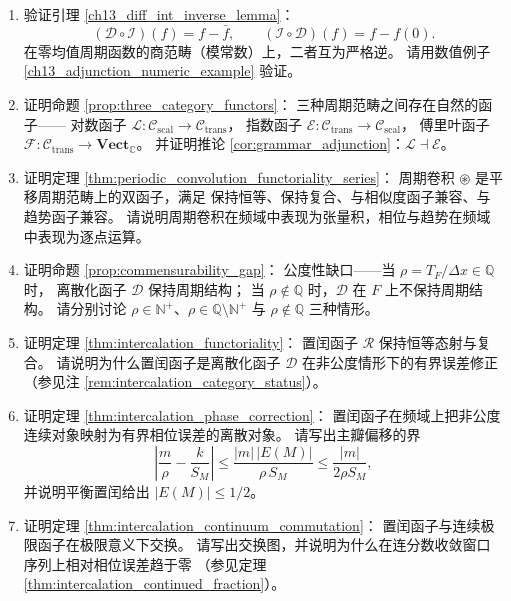 \begin{enumerate}[leftmargin=3em, label=\textbf{题 \arabic*}]
    \item 验证引理 \ref{ch13_diff_int_inverse_lemma}：
    \[
    (\mathcal{D}\circ\mathcal{I})(f)=f-\bar{f},\qquad
    (\mathcal{I}\circ\mathcal{D})(f)=f-f(0).
    \]
    在零均值周期函数的商范畴（模常数）上，二者互为严格逆。
    请用数值例子 \ref{ch13_adjunction_numeric_example} 验证。

    \item 证明命题 \ref{prop:three_category_functors}：
    三种周期范畴之间存在自然的函子——
    对数函子 $\mathcal{L}:\mathcal{C}_{\text{scal}}\to\mathcal{C}_{\text{trans}}$，
    指数函子 $\mathcal{E}:\mathcal{C}_{\text{trans}}\to\mathcal{C}_{\text{scal}}$，
    傅里叶函子 $\mathcal{F}:\mathcal{C}_{\text{trans}}\to\mathbf{Vect}_{\mathbb{C}}$。
    并证明推论 \ref{cor:grammar_adjunction}：$\mathcal{L}\dashv\mathcal{E}$。

    \item 证明定理 \ref{thm:periodic_convolution_functoriality_series}：
    周期卷积 $\circledast$ 是平移周期范畴上的双函子，满足
    保持恒等、保持复合、与相似度函子兼容、与趋势函子兼容。
    请说明周期卷积在频域中表现为张量积，相位与趋势在频域中表现为逐点运算。

    \item 证明命题 \ref{prop:commensurability_gap}：
    公度性缺口——当 $\rho=T_F/\Delta x\in\mathbb{Q}$ 时，
    离散化函子 $\mathcal{D}$ 保持周期结构；
    当 $\rho\notin\mathbb{Q}$ 时，$\mathcal{D}$ 在 $F$ 上不保持周期结构。
    请分别讨论 $\rho\in\mathbb{N}^+$、$\rho\in\mathbb{Q}\setminus\mathbb{N}^+$ 与 $\rho\notin\mathbb{Q}$ 三种情形。

    \item 证明定理 \ref{thm:intercalation_functoriality}：
    置闰函子 $\mathcal{R}$ 保持恒等态射与复合。
    请说明为什么置闰函子是离散化函子 $\mathcal{D}$ 在非公度情形下的有界误差修正
    （参见注 \ref{rem:intercalation_category_status}）。

    \item 证明定理 \ref{thm:intercalation_phase_correction}：
    置闰函子在频域上把非公度连续对象映射为有界相位误差的离散对象。
    请写出主瓣偏移的界
    \[
    \left|\frac{m}{\rho}-\frac{k}{S_M}\right|
    \le\frac{|m|\,|E(M)|}{\rho\,S_M}\le\frac{|m|}{2\rho S_M},
    \]
    并说明平衡置闰给出 $|E(M)|\le1/2$。

    \item 证明定理 \ref{thm:intercalation_continuum_commutation}：
    置闰函子与连续极限函子在极限意义下交换。
    请写出交换图，并说明为什么在连分数收敛窗口序列上相对相位误差趋于零
    （参见定理 \ref{thm:intercalation_continued_fraction}）。


\end{enumerate}
